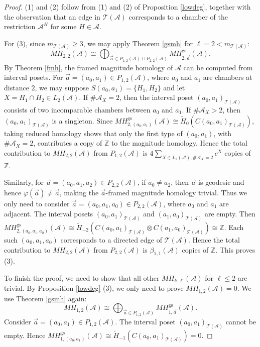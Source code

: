 \documentclass{amsart}
\numberwithin{equation}{section}
\theoremstyle{plain}
\theoremstyle{remark}
\theoremstyle{definition}
\numberwithin{equation}{section}
\newcommand{\A}{\mathcal{A}}
\newcommand{\T}{\mathcal{T}}
\newcommand{\Z}{\mathbb{Z}}
\newcommand{\gs}{\mathrm{gs}}
\begin{document}
\begin{proof}
    (1) and (2) follow from (1) and (2) of Proposition \ref{lowdeg}, together with the observation that an edge in $\T(\A)$ corresponds to a chamber of the restriction $\A^H$ for some $H\in\A$. 
    
    For (3), since $m_{\T(\A)}\geq 3$, we may apply Theorem \ref{gsmh} for $\ell=2<m_{\T(\A)}$:
    \[
    MH_{2,2}(\A)\cong \bigoplus_{\Vec{a}\in P_{1,2}(\A)\cup P_{2,2}(\A)}MH^{\gs}_{2,\Vec{a}}(\A).
    \]
    By Theorem \ref{fmh}, the framed magnitude homology of $\A$ can be computed from interval posets. For $\Vec{a}=(a_0,a_1)\in P_{1,2}(\A)$, where $a_0$ and $a_1$ are chambers at distance $2$, we may suppose $S(a_0,a_1)=\{H_1,H_2\}$ and let $X=H_1\cap H_2\in L_2(\A)$. If $\#\A_X=2$, then the interval poset $(a_0,a_1)_{\T(\A)}$ consists of two incomparable chambers between $a_0$ and $a_1$. If $\#\A_X>2$, then $(a_0,a_1)_{\T(\A)}$ is a singleton. Since $MH^{\gs}_{2,(a_0,a_1)}(\A)\cong \widetilde{H}_0(C(a_0,a_1)_{\T(\A)})$, taking reduced homology shows that only the first type of $(a_0,a_1)$, with $\#\A_X=2$, contributes a copy of $\Z$ to the magnitude homology. Hence the total contribution to $MH_{2,2}(\A)$ from $P_{1,2}(\A)$ is $4\sum_{X\in L_2(\A),\#\A_X=2}c^X$ copies of $\Z$.
    
    Similarly, for $\Vec{a}=(a_0,a_1,a_2)\in P_{2,2}(\A)$, if $a_0\neq a_2$, then $\Vec{a}$ is geodesic and hence $\varphi(\Vec{a})\neq \Vec{a}$, making the $\Vec{a}$-framed magnitude homology trivial. Thus we only need to consider $\Vec{a}=(a_0,a_1,a_0)\in P_{2,2}(\A)$, where $a_0$ and $a_1$ are adjacent. The interval posets $(a_0,a_1)_{\T(\A)}$ and $(a_1,a_0)_{\T(\A)}$ are empty. Then $MH^{\gs}_{2,(a_0,a_1,a_0)}(\A)\cong \widetilde{H}_{-2}(C(a_0,a_1)_{\T(\A)}\otimes C(a_1,a_0)_{\T(\A)})\cong \Z$. Each such $(a_0,a_1,a_0)$ corresponds to a directed edge of $\T(\A)$. Hence the total contribution to $MH_{2,2}(\A)$ from $P_{2,2}(\A)$ is $\beta_{1,1}(\A)$ copies of $\Z$. This proves (3).

    To finish the proof, we need to show that all other $MH_{k,\ell}(\A)$ for $\ell\leq 2$ are trivial. By Proposition \ref{lowdeg} (3), we only need to prove $MH_{1,2}(\A)=0$. We use Theorem \ref{gsmh} again:
    \[
    MH_{1,2}(\A)\cong \bigoplus_{\Vec{a}\in P_{1,2}(\A)}MH^{\gs}_{1,\Vec{a}}(\A).
    \]
    Consider $\Vec{a}=(a_0,a_1)\in P_{1,2}(\A)$. The interval poset $(a_0,a_1)_{\T(\A)}$ cannot be empty. Hence $MH^{\gs}_{1,(a_0,a_1)}(\A)\cong \widetilde{H}_{-1}(C(a_0,a_1)_{\T(\A)})=0$.
\end{proof}
\end{document}
